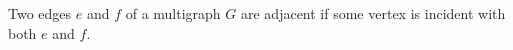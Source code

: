 \begin{definition}
Two edges $e$ and $f$ of a multigraph $G$ are adjacent if some vertex is
incident with both $e$ and $f$.
\end{definition}
